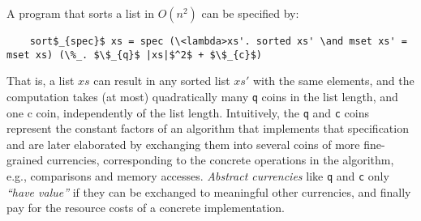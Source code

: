 \documentclass[acmsmall]{acmart}
\newcommand{\is}{\lstinline[language=isabelle]}
\begin{document}
\begin{example}
A program that sorts a list in $O(n^2)$ can be specified by:
\begin{lstlisting}
    sort$_{spec}$ xs = spec (\<lambda>xs'. sorted xs' \and mset xs' = mset xs) (\%_. $\$_{q}$ |xs|$^2$ + $\$_{c}$)
\end{lstlisting}
That is, a list $xs$ can result in any sorted list $xs'$ with the same elements, and the computation takes (at most) quadratically many \is{q} coins in the list length, and one c coin, independently of the list length.
Intuitively, the \is{q} and \is{c} coins represent the constant factors of an algorithm that implements that specification and are later elaborated by exchanging them into several coins of more fine-grained currencies, corresponding to the concrete operations in the algorithm, e.g., comparisons and memory accesses.
\emph{Abstract currencies} like \is{q} and \is{c} only \emph{``have value''} if they can be exchanged to meaningful other currencies, and finally pay for the resource costs of a concrete implementation. 
\end{example}
\end{document}
